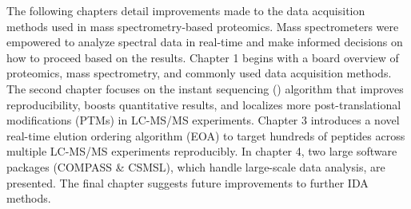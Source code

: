 The following chapters detail improvements made to the data acquisition methods used in mass spectrometry-based proteomics. Mass spectrometers were empowered to analyze spectral data in real-time and make informed decisions on how to proceed based on the results. Chapter 1 begins with a board overview of proteomics, mass spectrometry, and commonly used data acquisition methods. The second chapter focuses on the instant sequencing (\inseq{}) algorithm that improves reproducibility, boosts quantitative results, and localizes more post-translational modifications (PTMs) in LC-MS/MS experiments. Chapter 3 introduces a novel real-time elution ordering algorithm (EOA) to target hundreds of peptides across multiple LC-MS/MS experiments reproducibly. In chapter 4, two large software packages (COMPASS \& CSMSL), which handle large-scale data analysis, are presented. The final chapter suggests future improvements to further IDA methods.